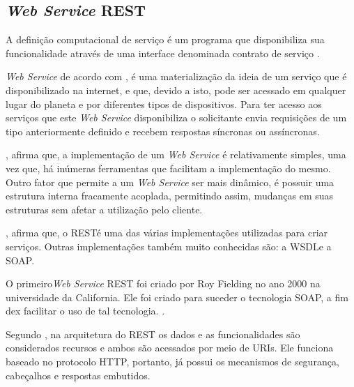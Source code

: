 \subsection{\textit{Web Service} REST}

A definição computacional de serviço é um programa que disponibiliza sua funcionalidade através de uma interface denominada contrato de serviço \cite{erl_soa_with_rest}.

\textit{Web Service} de acordo com , é uma materialização da ideia de um serviço que é disponibilizado na internet, e que, devido a isto, pode ser acessado em qualquer lugar do planeta e por diferentes tipos de dispositivos. Para ter acesso aos serviços que este \textit{Web Service} disponibiliza o solicitante envia requisições de um tipo anteriormente definido e recebem respostas síncronas ou assíncronas.

, afirma que, a implementação de um \textit{Web Service} é relativamente simples, uma vez que, há inúmeras ferramentas que facilitam a implementação do mesmo. Outro fator que permite a um \textit{Web Service} ser mais dinâmico, é possuir uma estrutura interna fracamente acoplada, permitindo assim, mudanças em suas estruturas sem afetar a utilização pelo cliente.

, afirma que, o REST\footnotemark[20] é uma das várias implementações utilizadas para criar serviços. Outras implementações também muito conhecidas são: a WSDL\footnotemark[21] e a SOAP\footnotemark[22].




O primeiro\textit{Web Service} REST foi criado por Roy Fielding no ano 2000 na universidade da California. Ele foi criado para suceder o tecnologia SOAP, a fim dex facilitar o uso de tal tecnologia. \cite{ibm_web_service}.

Segundo , na arquitetura do REST os dados e as funcionalidades são considerados recursos e ambos são acessados por meio de  URIs\footnotemark[23]. Ele funciona baseado no protocolo HTTP, portanto, já possui os mecanismos de segurança, cabeçalhos e respostas embutidos.

